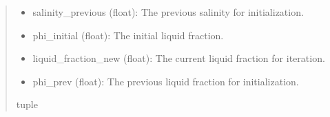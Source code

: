 \documentclass[a4paper,11pt,english,openany]{sphinxmanual}
\begin{document}
\begin{fulllineitems}
\begin{quote}
\begin{description}
\begin{description}
\begin{itemize}
\item {} 
\sphinxAtStartPar
salinity\_previous (float): The previous salinity for initialization.

\item {} 
\sphinxAtStartPar
phi\_initial (float): The initial liquid fraction.

\item {} 
\sphinxAtStartPar
liquid\_fraction\_new (float): The current liquid fraction for iteration.

\item {} 
\sphinxAtStartPar
phi\_prev (float): The previous liquid fraction for initialization.

\end{itemize}

\end{description}


\sphinxAtStartPar
tuple

\end{description}\end{quote}

\end{fulllineitems}

\end{document}
